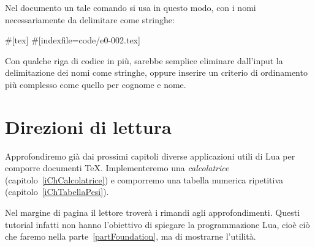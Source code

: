 Nel documento un tale comando si usa in questo modo, con i nomi necessariamente
da delimitare come stringhe:
\begin{lines}
#[tex]
#[indexfile=code/e0-002.tex]
\end{lines}

Con qualche riga di codice in più, sarebbe semplice eliminare dall'input la
delimitazione dei nomi come stringhe, oppure inserire un criterio di ordinamento
più complesso come quello per cognome e nome.


\section{Direzioni di lettura}

Approfondiremo già dai prossimi capitoli diverse applicazioni utili di Lua per
comporre documenti \TeX. Implementeremo una \emph{calcolatrice}
(capitolo~\ref{iChCalcolatrice}) e comporremo una tabella numerica ripetitiva
(capitolo~\ref{iChTabellaPesi}).

Nel margine di pagina il lettore troverà i rimandi agli approfondimenti. Questi
tutorial infatti non hanno l'obiettivo di spiegare la programmazione Lua, cioè
ciò che faremo nella parte~\ref{partFoundation}, ma di mostrarne l'utilità.

